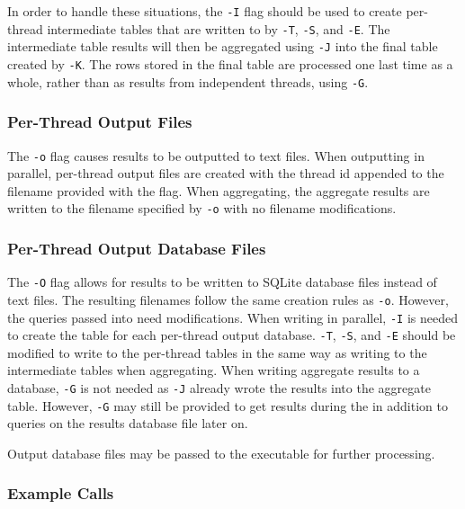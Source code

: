 In order to handle these situations, the \texttt{-I} flag should be
used to create per-thread intermediate tables that are written to by
\texttt{-T}, \texttt{-S}, and \texttt{-E}. The intermediate table
results will then be aggregated using \texttt{-J} into the final table
created by \texttt{-K}. The rows stored in the final table are
processed one last time as a whole, rather than as results from
independent threads, using \texttt{-G}.

\subsubsection{Per-Thread Output Files}
The \texttt{-o} flag causes results to be outputted to text
files. When outputting in parallel, per-thread output files are
created with the thread id appended to the filename provided with the
flag. When aggregating, the aggregate results are written to the
filename specified by \texttt{-o} with no filename modifications.

\subsubsection{Per-Thread Output Database Files}
The \texttt{-O} flag allows for results to be written to SQLite
database files instead of text files. The resulting filenames follow
the same creation rules as \texttt{-o}. However, the queries passed
into \gufiquery need modifications. When writing in parallel,
\texttt{-I} is needed to create the table for each per-thread output
database. \texttt{-T}, \texttt{-S}, and \texttt{-E} should be modified
to write to the per-thread tables in the same way as writing to the
intermediate tables when aggregating. When writing aggregate results
to a database, \texttt{-G} is not needed as \texttt{-J} already wrote
the results into the aggregate table. However, \texttt{-G} may still
be provided to get results during the \gufiquery in addition to
queries on the results database file later on.

Output database files may be passed to the \querydbs executable for
further processing.

\subsubsection{Example Calls}

